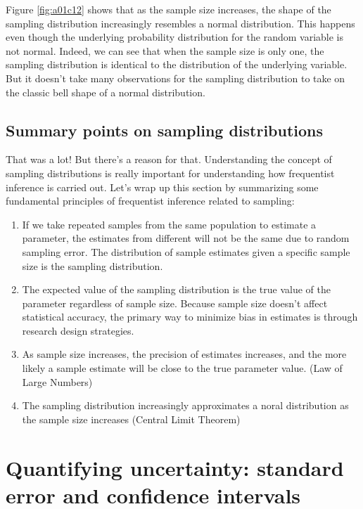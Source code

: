 \documentclass[
]{book}
\begin{document}
Figure \ref{fig:a01c12} shows that as the sample size increases, the shape of the sampling distribution increasingly resembles a normal distribution. This happens even though the underlying probability distribution for the random variable is not normal. Indeed, we can see that when the sample size is only one, the sampling distribution is identical to the distribution of the underlying variable. But it doesn't take many observations for the sampling distribution to take on the classic bell shape of a normal distribution.

\subsection{Summary points on sampling distributions}\label{summary-points-on-sampling-distributions}

That was a lot! But there's a reason for that. Understanding the concept of sampling distributions is really important for understanding how frequentist inference is carried out. Let's wrap up this section by summarizing some fundamental principles of frequentist inference related to sampling:

\begin{enumerate}
\def\labelenumi{\arabic{enumi}.}
\item
  If we take repeated samples from the same population to estimate a parameter, the estimates from different will not be the same due to random sampling error. The distribution of sample estimates given a specific sample size is the sampling distribution.
\item
  The expected value of the sampling distribution is the true value of the parameter regardless of sample size. Because sample size doesn't affect statistical accuracy, the primary way to minimize bias in estimates is through research design strategies.
\item
  As sample size increases, the precision of estimates increases, and the more likely a sample estimate will be close to the true parameter value. (Law of Large Numbers)
\item
  The sampling distribution increasingly approximates a noral distribution as the sample size increases (Central Limit Theorem)
\end{enumerate}

\section{Quantifying uncertainty: standard error and confidence intervals}\label{quantifying-uncertainty-standard-error-and-confidence-intervals}
\end{document}
